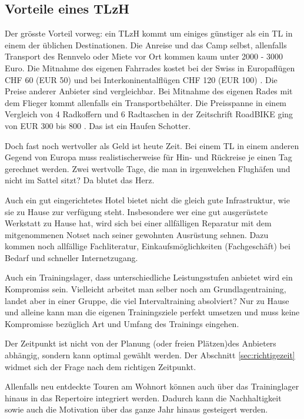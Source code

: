 \documentclass[a4paper,DIV13,BCOR0cm]{scrartcl}
\newcommand{\rv}{Rennvelo}
\newcommand{\tlzh}{TLzH}
\begin{document}
\subsection{Vorteile eines \tlzh}

Der grösste Vorteil vorweg: ein \tlzh{} kommt um einiges günstiger als ein TL in einem der üblichen Destinationen.
Die Anreise und das Camp selbst, allenfalls Transport des \rv{} oder Miete vor Ort kommen kaum unter 2000 - 3000 Euro.
Die Mitnahme des eigenen Fahrrades kostet bei der Swiss in Europaflügen CHF 60 (EUR 50) und bei Interkoninentalflügen CHF 120 (EUR 100)
\cite{swiss2016fahrradmitnahme}. Die Preise anderer Anbieter sind vergleichbar.
Bei Mitnahme des eigenen Rades mit dem Flieger kommt allenfalls ein Transportbehälter.
Die Preisspanne in einem Vergleich von 4 Radkoffern und 6 Radtaschen in der Zeitschrift RoadBIKE ging von EUR 300 bis 800
\cite{Brunker2015radkoffer}.
Das ist ein Haufen Schotter.


Doch fast noch wertvoller als Geld ist heute Zeit.
Bei einem TL in einem anderen Gegend von Europa muss realistischerweise für Hin- und Rückreise je einen Tag gerechnet werden.
Zwei wertvolle Tage, die man in irgenwelchen Flughäfen und nicht im Sattel sitzt?
Da blutet das Herz.

Auch ein gut eingerichtetes Hotel bietet nicht die gleich gute Infrastruktur, wie sie zu Hause zur verfügung steht.
Insbesondere wer eine gut ausgerüstete Werkstatt zu Hause hat, wird sich bei einer allfälligen Reparatur mit dem
mitgenommenen Notset nach seiner gewohnten Ausrüstung sehnen.
Dazu kommen noch allfällige Fachliteratur, Einkaufsmöglichkeiten (Fachgeschäft) bei Bedarf und schneller Internetzugang.

Auch ein Trainingslager, dass unterschiedliche Leistungsstufen anbietet wird ein Kompromiss sein.
Vielleicht arbeitet man selber noch am Grundlagentraining, landet aber in einer Gruppe, die viel Intervaltraining absolviert?
Nur zu Hause und alleine kann man die eigenen Trainingsziele perfekt umsetzen und muss keine Kompromisse bezüglich Art und Umfang des Trainings eingehen.

Der Zeitpunkt ist nicht von der Planung (oder freien Plätzen)des Anbieters abhängig, sondern kann optimal gewählt werden.
Der Abschnitt \ref{sec:richtigezeit} widmet sich der Frage nach dem richtigen Zeitpunkt.

Allenfalls neu entdeckte Touren am Wohnort können auch über das Traininglager hinaus in das Repertoire integriert werden.
Dadurch kann die Nachhaltigkeit sowie auch die Motivation über das ganze Jahr hinaus gesteigert werden.
\end{document}
